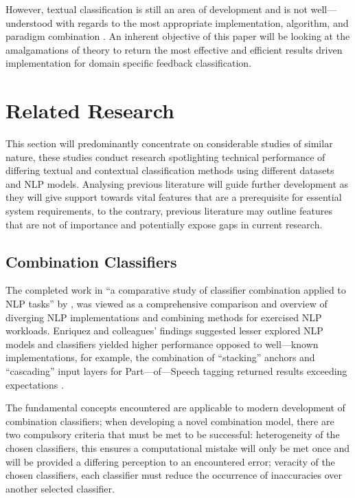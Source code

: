 However, textual classification is still an area of development and is not well---understood with regards to the most appropriate implementation, algorithm, and paradigm combination \parencite{thangaraj2018text}. An inherent objective of this paper will be looking at the amalgamations of theory to return the most effective and efficient results driven implementation for domain specific feedback classification.

\section{Related Research}

This section will predominantly concentrate on considerable studies of similar nature, these studies conduct research spotlighting technical performance of differing textual and contextual classification methods using different datasets and NLP models. Analysing previous literature will guide further development as they will give support towards vital features that are a prerequisite for essential system requirements, to the contrary, previous literature may outline features that are not of importance and potentially expose gaps in current research.

\subsection{Combination Classifiers}

The completed work in “a comparative study of classifier combination applied to NLP tasks” by \textcite{enriquez2013comparative}, was viewed as a comprehensive comparison and overview of diverging NLP implementations and combining methods for exercised NLP workloads. Enriquez and colleagues’ findings suggested lesser explored NLP models and classifiers yielded higher performance opposed to well---known implementations, for example, the combination of “stacking” anchors and “cascading” input layers for Part---of---Speech tagging returned results exceeding expectations \parencite{enriquez2013comparative}.

The fundamental concepts \textcite{enriquez2013comparative} encountered are applicable to modern development of combination classifiers; when developing a novel combination model, there are two compulsory criteria that must be met to be successful: heterogeneity of the chosen classifiers, this ensures a computational mistake will only be met once and will be provided a differing perception to an encountered error; veracity of the chosen classifiers, each classifier must reduce the occurrence of inaccuracies over another selected classifier.

